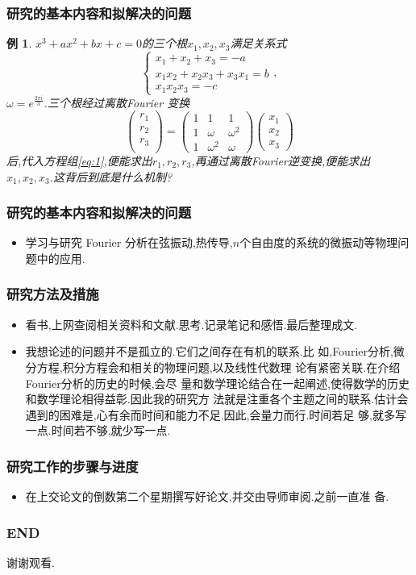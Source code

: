 \documentclass{beamer}
\newtheorem{exam}{例}
\begin{document}
\begin{frame}
  \frametitle{研究的基本内容和拟解决的问题}
      \begin{exam}
$x^3+ax^2+bx+c=0$的三个根$x_1,x_2,x_3$满足关系式
\begin{equation}\label{eq:1}
\begin{cases}
  x_1+x_2+x_3=-a\\
x_1x_2+x_2x_3+x_3x_1=b\\
x_1x_2x_3=-c
\end{cases},
\end{equation}
$\omega=e^{\frac{2\pi i}{3}}$.三个根经过离散Fourier 变换
$$
\begin{pmatrix}
  r_{1}\\
r_{2}\\
r_{3}\\
\end{pmatrix}=
\begin{pmatrix}
  1&1&1\\
1&\omega&\omega^{2}\\
1&\omega^{2}&\omega
\end{pmatrix}
\begin{pmatrix}
  x_1\\
x_2\\
x_3
\end{pmatrix}
$$
后,代入方程组\eqref{eq:1},便能求出$r_1,r_2,r_3$,再通过离散Fourier逆变换,便能求出
$x_1,x_2,x_3$.这背后到底是什么机制?
  \end{exam}
\end{frame}
\begin{frame}
  \frametitle{研究的基本内容和拟解决的问题}
  \begin{itemize}
  \item 学习与研究 Fourier 分析在弦振动,热传导,$n$个自由度的系统的微振动等物理问
    题中的应用.
  \end{itemize}
\end{frame}
\begin{frame}
  \frametitle{研究方法及措施}
\begin{itemize}
\item  看书,上网查阅相关资料和文献.思考.记录笔记和感悟.最后整理成文.\pause
\item 我想论述的问题并不是孤立的.它们之间存在有机的联系.比
  如,Fourier分析,微分方程,积分方程会和相关的物理问题,以及线性代数理
  论有紧密关联.在介绍Fourier分析的历史的时候,会尽
  量和数学理论结合在一起阐述,使得数学的历史和数学理论相得益彰.因此我的研究方
  法就是注重各个主题之间的联系.估计会遇到的困难是,心有余而时间和能力不足.因此,会量力而行.时间若足
  够,就多写一点.时间若不够,就少写一点.
\end{itemize}
\end{frame}
\begin{frame}
  \frametitle{研究工作的步骤与进度}
  \begin{itemize}
  \item 在上交论文的倒数第二个星期撰写好论文,并交由导师审阅.之前一直准
    备.
  \end{itemize}
\end{frame}
\begin{frame}
  \frametitle{END}
\begin{center}
谢谢观看.
\end{center}
\end{frame}
\end{document}
